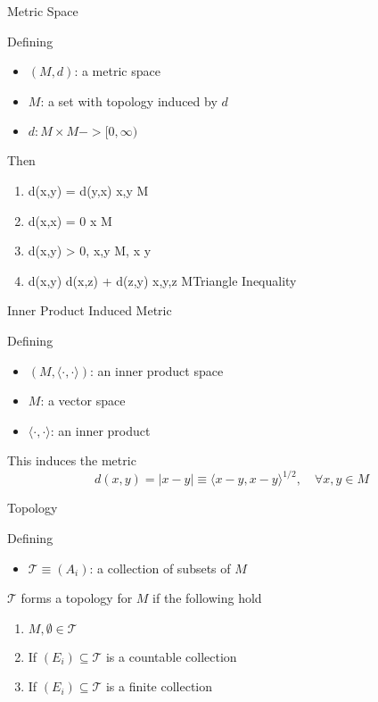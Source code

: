 \begin{definition}{Metric Space}

    Defining
    \begin{itemize}
        \item $(M,d)$: a metric space
        \item $M$: a set with topology induced by $d$
        \item $d: M \times M -> [0, \infty)$
    \end{itemize}
    Then
    \begin{enumerate}
        \item d(x,y) = d(y,x) \forall x,y \in M \hfill{}
        \item d(x,x) = 0 \forall x \in M
        \item d(x,y) > 0, \forall x,y \in M, x \neq y \hfill{}
        \item d(x,y) \leq d(x,z) + d(z,y) \forall x,y,z \in M\hfill{Triangle Inequality}
    \end{enumerate}

\end{definition}

\begin{definition}{Inner Product Induced Metric}

    Defining
    \begin{itemize}
        \item $(M, \langle \cdot, \cdot \rangle)$: an inner product space
        \item $M$: a vector space
        \item $\langle \cdot, \cdot \rangle$: an inner product
    \end{itemize}
    This induces the metric
    \begin{equation}
        d(x,y) = |x-y| \equiv \langle x-y, x-y \rangle^{1/2}, \quad\forall x,y \in M
    \end{equation}

\end{definition}

\begin{definition}{Topology}

    Defining
    \begin{itemize}
        \item $\mathcal{T} \equiv (A_i)$: a collection of subsets of $M$
    \end{itemize}
    $\mathcal{T}$ forms a topology for $M$ if the following hold
    \begin{enumerate}
        \item $M, \emptyset \in \mathcal{T}$
        \item If $(E_i) \subseteq \mathcal{T}$ is a countable collection
        \item If $(E_i) \subseteq \mathcal{T}$ is a finite collection
    \end{enumerate}
    
\end{definition}

